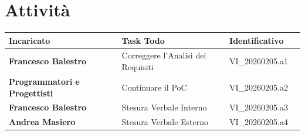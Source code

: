 \documentclass[a4paper,12pt]{article}
\begin{document}
    \section{Attività} {
        \begin{tabularx}{\textwidth}{|l|X|l|l|}
            \hline
            \textbf{Incaricato} & \textbf{Task Todo} & \textbf{Identificativo} \\
            \hline
            \textbf{Francesco Balestro} & Correggere l'Analisi dei Requisiti & VI\_20260205.a1 \\
            \hline
            \textbf{Programmatori e Progettisti} & Continuare il PoC & VI\_20260205.a2 \\
            \hline
            \textbf{Francesco Balestro} & Stesura Verbale Interno & VI\_20260205.a3 \\
            \hline
            \textbf{Andrea Masiero} & Stesura Verbale Esterno & VI\_20260205.a4 \\
            \hline
        \end{tabularx}
    }
\end{document}
